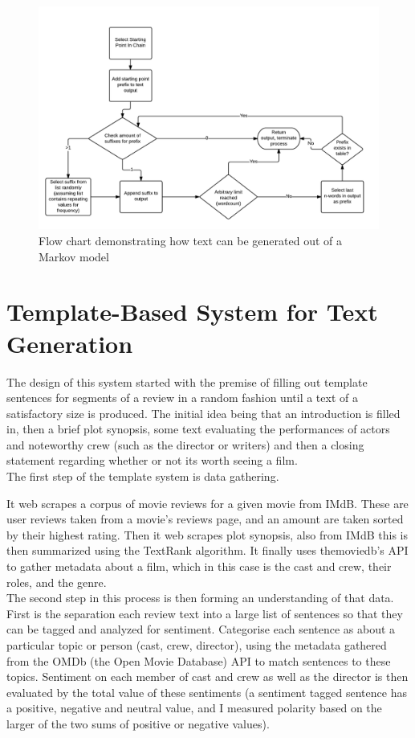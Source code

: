\begin{figure}
\centering
\includegraphics[width=0.7\linewidth]{"figures/diagrams_etc/markov_generatetext - Page 1"}
\caption{Flow chart demonstrating how text can be generated out of a Markov model}
\label{fig:markovgeneratetext---page-1}
\end{figure}



\section{Template-Based System for Text Generation}
The design of this system started with the premise of filling out template sentences for segments of a review in a random fashion until a text of a satisfactory size is produced. The initial idea being that an introduction is filled in, then a brief plot synopsis, some text evaluating the performances of actors and noteworthy crew (such as the director or writers) and then a closing statement regarding whether or not its worth seeing a film.\\

The first step of the template system is data gathering.

It web scrapes a corpus of movie reviews for a given movie from IMdB. These are user reviews taken from a movie's reviews page, and an amount are taken sorted by their highest rating. Then it web scrapes plot synopsis, also from IMdB this is then summarized using the TextRank algorithm. It finally uses themoviedb's API to gather metadata about a film, which in this case is the cast and crew, their roles, and the genre.\\


The second step in this process is then forming an understanding of that data.
First is the separation each review text into a large list of sentences so that they can be tagged and analyzed for sentiment.
Categorise each sentence as about a particular topic or person (cast, crew, director), using the metadata gathered from the OMDb (the Open Movie Database) API to match sentences to these topics. Sentiment on each member of cast and crew as well as the director is then evaluated by the total value of these sentiments (a sentiment tagged sentence has a positive, negative and neutral value, and I measured polarity based on the larger of the two sums of positive or negative values).\\

